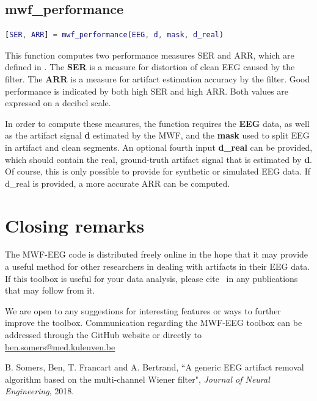 \documentclass[11pt]{article}
\begin{document}
\subsection{mwf\_performance}

\begin{lstlisting}[frame=single, language=matlab]
[SER, ARR] = mwf_performance(EEG, d, mask, d_real)
\end{lstlisting}

This function computes two performance measures SER and ARR, which are defined in \cite{somers2018generic}. The \textbf{SER} is a measure for distortion of clean EEG caused by the filter. The \textbf{ARR} is a measure for artifact estimation accuracy by the filter. Good performance is indicated by both high SER and high ARR. Both values are expressed on a decibel scale.

In order to compute these measures, the function requires the \textbf{EEG} data, as well as the artifact signal \textbf{d} estimated by the MWF, and the \textbf{mask} used to split EEG in artifact and clean segments. An optional fourth input \textbf{d\_real} can be provided, which should contain the real, ground-truth artifact signal that is estimated by \textbf{d}. Of course, this is only possible to provide for synthetic or simulated EEG data. If d\_real is provided, a more accurate ARR can be computed.

\newpage
\section{Closing remarks}

The MWF-EEG code is distributed freely online in the hope that it may provide a useful method for other researchers in dealing with artifacts in their EEG data. If this toolbox is useful for your data analysis, please cite~ \cite{somers2018generic} in any publications that may follow from it.

We are open to any suggestions for interesting features or ways to further improve the toolbox. Communication regarding the MWF-EEG toolbox can be addressed through the GitHub website or directly to \href{mailto:ben.somers@med.kuleuven.be}{ben.somers@med.kuleuven.be}

\begin{thebibliography}{9}

  B. Somers, Ben, T. Francart and A. Bertrand,
  ``A generic EEG artifact removal algorithm based on the multi-channel Wiener filter", 
  \textit{Journal of Neural Engineering},
  2018.

\end{thebibliography}
\end{document}
